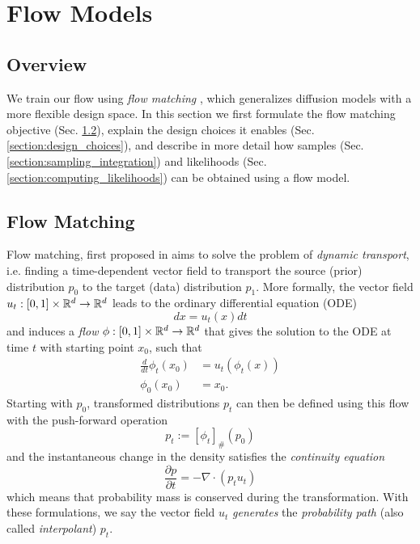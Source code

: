 
\chapter{Flow Models}\label{section:flow_models}

\section{Overview}

We train our flow using \textit{flow matching} \citep{lipmanFlowMatchingGenerative2023,albergoStochasticInterpolantsUnifying2023,liuFlowStraightFast2022}, which generalizes diffusion models with a more flexible design space. In this section we first formulate the flow matching objective (Sec. \ref{section:flow_matching}), explain the design choices it enables (Sec. \ref{section:design_choices}), and describe in more detail how samples (Sec. \ref{section:sampling_integration}) and likelihoods (Sec. \ref{section:computing_likelihoods}) can be obtained using a flow model. 

\section{Flow Matching} \label{section:flow_matching}

Flow matching, first proposed in \citep{lipmanFlowMatchingGenerative2023,albergoStochasticInterpolantsUnifying2023,liuFlowStraightFast2022} aims to solve the problem of \textit{dynamic transport}, i.e. finding a time-dependent vector field to transport the source (prior) distribution $p_0$ to the target (data) distribution $p_1$. More formally, the vector field $u_t: [0,1] \times \mathbb{R}^d \to \mathbb{R}^d$ leads to the ordinary differential equation (ODE)
\begin{equation} \label{eq:ode}
    dx = u_t(x) dt
\end{equation}
and induces a \textit{flow} $\phi: [0,1] \times \mathbb{R}^d \to \mathbb{R}^d$ that gives the solution to the ODE at time $t$ with starting point $x_0$, such that 
\begin{align}
    \frac{d}{dt} \phi_t(x_0) &= u_t(\phi_t(x)) \\
    \phi_0(x_0) &= x_0.
\end{align}
Starting with $p_0$, transformed distributions $p_t$ can then be defined using this flow with the push-forward operation
\begin{equation}
    p_t := [\phi_t]_\# (p_0)
\end{equation} 
and the instantaneous change in the density satisfies the \textit{continuity equation}
\begin{equation}
    \frac{\partial p}{\partial t} = - \nabla \cdot (p_t u_t)
\end{equation}
which means that probability mass is conserved during the transformation. With these formulations, we say the vector field $u_t$ \textit{generates} the \textit{probability path} (also called \textit{interpolant}) $p_t$.

